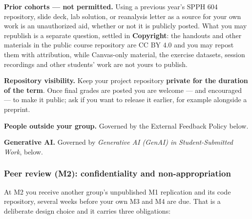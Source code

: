 \documentclass[
]{article}
\begin{document}
\textbf{Prior cohorts --- not permitted.} Using a previous year's SPPH
604 repository, slide deck, lab solution, or reanalysis letter as a
source for your own work is an unauthorized aid, whether or not it is
publicly posted. What you may republish is a separate question, settled
in \textbf{Copyright}: the handouts and other materials in the public
course repository are CC BY 4.0 and you may repost them with
attribution, while Canvas-only material, the exercise datasets, session
recordings and other students' work are not yours to publish.

\textbf{Repository visibility.} Keep your project repository
\textbf{private for the duration of the term}. Once final grades are
posted you are welcome --- and encouraged --- to make it public; ask if
you want to release it earlier, for example alongside a preprint.

\textbf{People outside your group.} Governed by the External Feedback
Policy below.

\textbf{Generative AI.} Governed by \emph{Generative AI (GenAI) in
Student-Submitted Work}, below.

\subsubsection{Peer review (M2): confidentiality and
non-appropriation}\label{peer-review-m2-confidentiality-and-non-appropriation}

At M2 you receive another group's unpublished M1 replication and its
code repository, several weeks before your own M3 and M4 are due. That
is a deliberate design choice and it carries three obligations:
\end{document}
